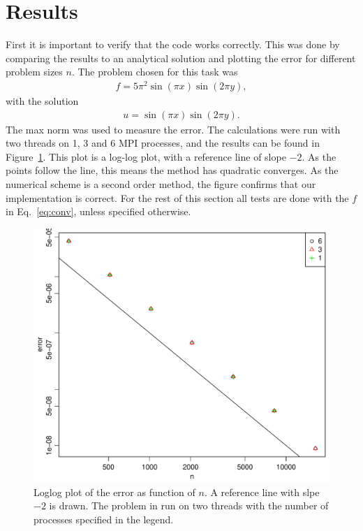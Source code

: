\section{Results}
%
First it is important to verify that the code works correctly. This was done by comparing the results to an analytical solution and plotting the error for different problem sizes $n$. The problem chosen for this task was 
\begin{align}
  \label{eq:conv} 
  f = 5 \pi^2 \sin (\pi x) \sin (2 \pi y),
\end{align}
with the solution
\begin{align}
  u = \sin (\pi x) \sin (2 \pi y). 
\end{align}
The max norm was used to measure the error. The calculations were run with two threads on 1, 3 and 6 MPI processes, and the results can be found in Figure~\ref{fig:errVsn}. This plot is a log-log plot, with a reference line of slope $-2$. As the points follow the line, this means the method has quadratic converges. As the numerical scheme is a second order method, the figure confirms that our implementation is correct. For the rest of this section all tests are done with the $f$ in Eq.~\eqref{eq:conv}, unless specified otherwise.\\
%
\begin{figure}[h!]
\begin{center}
    \includegraphics[scale=0.5]{./Figures/errVsn.pdf}
\end{center}
\caption{Loglog plot of the error as function of $n$. A reference line with slpe $-2$ is drawn. The problem in run on two threads with the number of processes specified in the legend.}
\label{fig:errVsn}
\end{figure}
